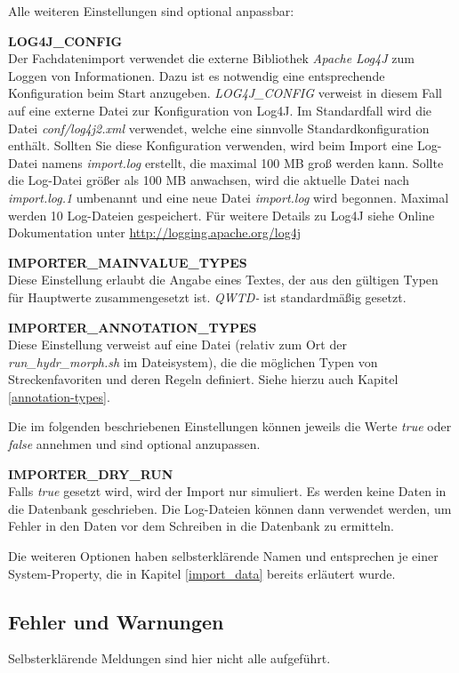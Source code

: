 Alle weiteren Einstellungen sind optional anpassbar:

\textbf{LOG4J\_CONFIG}
\\Der Fachdatenimport verwendet die externe Bibliothek \textit{Apache Log4J} zum Loggen
von Informationen. Dazu ist es notwendig eine entsprechende Konfiguration beim
Start anzugeben. \textit{LOG4J\_CONFIG} verweist in diesem Fall auf eine externe
Datei zur Konfiguration von Log4J. Im Standardfall wird die Datei
\textit{conf/log4j2.xml} verwendet, welche eine sinnvolle Standardkonfiguration
enthält. Sollten Sie diese Konfiguration verwenden, wird beim Import eine
Log-Datei namens \textit{import.log} erstellt, die maximal 100 MB groß werden
kann. Sollte die Log-Datei größer als 100 MB anwachsen, wird die aktuelle Datei
nach \textit{import.log.1} umbenannt und eine neue Datei \textit{import.log}
wird begonnen. Maximal werden 10 Log-Dateien gespeichert. Für weitere Details
zu Log4J siehe Online Dokumentation unter
\href{http://logging.apache.org/log4j}{http://logging.apache.org/log4j}


\textbf{IMPORTER\_MAINVALUE\_TYPES}
\\Diese Einstellung erlaubt die Angabe eines Textes, der aus den gültigen Typen
für Hauptwerte zusammengesetzt ist. \textit{QWTD-} ist standardmäßig gesetzt.

\textbf{IMPORTER\_ANNOTATION\_TYPES}
\\Diese Einstellung verweist auf eine Datei (relativ zum Ort der \textit{run\_hydr\_morph.sh}
im Dateisystem), die die möglichen Typen von Streckenfavoriten und deren Regeln
definiert. Siehe hierzu auch Kapitel \ref{annotation-types}.


Die im folgenden beschriebenen Einstellungen können jeweils die Werte
\textit{true} oder \textit{false} annehmen und sind optional anzupassen.

\textbf{IMPORTER\_DRY\_RUN}
\\Falls \textit{true} gesetzt wird, wird der Import nur simuliert. Es werden
keine Daten in die Datenbank geschrieben. Die Log-Dateien können dann verwendet werden, um Fehler in den Daten vor dem Schreiben in die
Datenbank zu ermitteln.

Die weiteren Optionen haben selbsterklärende Namen und
entsprechen je einer System-Property,
die in Kapitel \ref{import_data} bereits erläutert wurde.

\subsection{Fehler und Warnungen}
Selbsterklärende Meldungen sind hier nicht alle aufgeführt.

